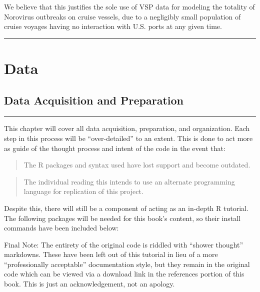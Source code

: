 \documentclass[
  11,
]{book}
\begin{document}
We believe that this justifies the sole use of VSP data for modeling the totality of Norovirus outbreaks on cruise vessels, due to a negligibly small population of cruise voyages having no interaction with U.S. ports at any given time.

\begin{center}\rule{0.5\linewidth}{0.5pt}\end{center}

\hypertarget{part-data}{%
\part{Data}\label{part-data}}

\hypertarget{data-acquisition-and-preparation}{%
\chapter*{Data Acquisition and Preparation}\label{data-acquisition-and-preparation}}


\begin{center}\rule{0.5\linewidth}{0.5pt}\end{center}

This chapter will cover all data acquisition, preparation, and organization. Each step in this process will be ``over-detailed'' to an extent. This is done to act more as guide of the thought process and intent of the code in the event that:

\begin{quote}
The R packages and syntax used have lost support and become outdated.
\end{quote}

\begin{quote}
The individual reading this intends to use an alternate programming language for replication of this project.
\end{quote}

Despite this, there will still be a component of acting as an in-depth R tutorial. The following packages will be needed for this book's content, so their install commands have been included below:

Final Note: The entirety of the original code is riddled with ``shower thought'' markdowns. These have been left out of this tutorial in lieu of a more ``professionally acceptable'' documentation style, but they remain in the original code which can be viewed via a download link in the references portion of this book. This is just an acknowledgement, not an apology.
\end{document}
